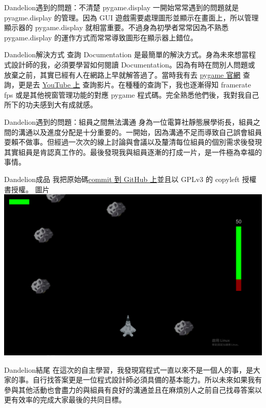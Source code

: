 \documentclass{article}
\begin{document}
\begin{large}
    \newpage
\begin{boxpar}{Dandelion}{遇到的問題：不清楚 pygame.display}
一開始常常遇到的問題就是 pyagme.display 的管理。因為 GUI
    遊戲需要處理圖形並顯示在畫面上，所以管理顯示器的 pygame.display
    就相當重要。不過身為初學者常常因為不熟悉 pygame.display
    的運作方式而常常導致圖形在顯示器上錯位。
    \begin{boxpar}{Dandelion}{解決方式}
        查詢 Documentation 是最簡單的解決方式。身為未來想當程式設計師的我，必須要學習如何閱讀
        Documentation。因為有時在問別人問題或放棄之前，其實已經有人在網路上早就解答過了。當時我有去
        \href{https://www.pygame.org/docs/ref/display.html}{pygame 官網} 查詢，更是去
        \href{https://www.youtube.com/watch?v=C8YtdC8mxTU}{YouTube 上}
        查詢影片。在種種的查詢下，我也逐漸得知 framerate fps
        或是其他視窗管理功能的對應 pygame
        程式碼。完全熟悉他們後，我對我自己所下的功夫感到大有成就感。
    \end{boxpar}
\end{boxpar}
\begin{boxpar}{Dandelion}{遇到的問題：組員之間無法溝通}
    身為一位電算社靜態展學術長，組員之間的溝通以及進度分配是十分重要的。一開始，因為溝通不足而導致自己誤會組員耍賴不做事。但經過一次次的線上討論與會議以及釐清每位組員的個別需求後發現其實組員是肯認真工作的。最後發現我與組員逐漸的打成一片，是一件極為幸福的事情。
\end{boxpar}
\begin{boxpar}{Dandelion}{成品}
    我把原始碼\href{https://github.com/hsnucrc46/crcproject}{commit 到 GitHub
    上}並且以 GPLv3 的 copyleft 授權書授權。
    圖片
    \includegraphics[width=\linewidth]{src/game.png}
\end{boxpar}
\begin{boxpar}{Dandelion}{結尾}
    在這次的自主學習，我發現寫程式一直以來不是一個人的事，是大家的事。自行找答案更是一位程式設計師必須具備的基本能力。所以未來如果我有參與其他活動也會盡力的與組員有良好的溝通並且在麻煩別人之前自己找尋答案以更有效率的完成大家最後的共同目標。
\end{boxpar}
\end{large}
\end{document}

